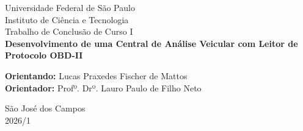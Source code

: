 \documentclass[a4paper, 12pt]{article}
\begin{document}
\begin{titlepage}
	\setcounter{page}{0}
	\begin{center}
		\normalsize{Universidade Federal de São Paulo}\\
		\normalsize{Instituto de Ciência e Tecnologia}\\
		\normalsize{Trabalho de Conclusão de Curso I}\\
		\vspace{15pt}
		\vspace{95pt}
		\textbf{Desenvolvimento de uma Central de Análise Veicular com Leitor de Protocolo OBD-II}\\
		\vspace{3,5cm}
	\end{center}
	
	\begin{flushleft}
		\begin{tabbing}
			\textbf{Orientando:} Lucas Praxedes Fischer de Mattos \\
			\textbf{Orientador:} Profº. Drº. Lauro Paulo de Filho Neto\\
		\end{tabbing}
	\end{flushleft}
	\vspace{1cm}
	
	\begin{center}
		\vspace{\fill}
		São José dos Campos\\
		2026/1
	\end{center}
\end{titlepage}
\end{document}
